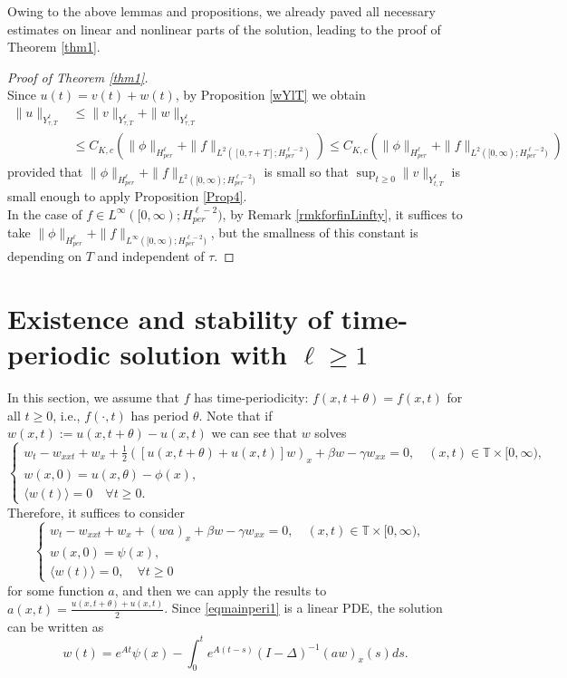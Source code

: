 \documentclass[10pt,a4paper,final]{article}
\numberwithin{equation}{section}
\newcommand{\lan}{\langle}
\newcommand{\ran}{\rangle}
\newcommand{\bT}{\mathbb{T}}
\newcommand{\Gb}{\beta}
\newcommand{\Gg}{\gamma}
\newcommand{\Gth}{\theta}
\begin{document}
Owing to the above lemmas and propositions, we already paved all necessary estimates on linear and nonlinear parts of the solution, leading to the proof of Theorem \ref{thm1}. 

\begin{proof}[Proof of Theorem \ref{thm1}]\ \\
    Since $u(t)=v(t)+w(t)$, by Proposition \ref{wYlT} we obtain
    \begin{align*}
        \|u\|_{Y^{\ell}_{\tau,T}}&\leq \|v\|_{Y^{\ell}_{\tau,T}}+\|w\|_{Y^{\ell}_{\tau,T}} \\&\leq C_{K,c} (\|\phi\|_{H^{\ell}_{per}}+\|f\|_{L^2([0,\tau+T];H^{\ell-2}_{per})})\leq C_{K,c} (\|\phi\|_{H^{\ell}_{per}}+\|f\|_{L^2([0,\infty);H^{\ell-2}_{per})})
    \end{align*}
    provided that $ \|\phi\|_{H^{\ell}_{per}}+\|f\|_{L^2([0,\infty);H^{\ell-2}_{per})}$ is small so that $\sup_{t\geq 0}\|v\|_{Y^{\ell}_{t,T}}$ is small enough to apply Proposition \ref{Prop4}.  \\

    In the case of $f\in L^{\infty}([0,\infty);H^{\ell-2}_{per})$, by Remark \ref{rmkforfinLinfty}, it suffices to take $\|\phi\|_{H^{\ell}_{per}}+\|f\|_{L^\infty([0,\infty);H^{\ell-2}_{per})}$, but the smallness of this constant is depending on $T$ and independent of $\tau$.
\end{proof}

\section{Existence and stability of time-periodic solution with $\ell\ge 1$}\label{Sec4}

In this section, we assume that $f$ has time-periodicity: $f(x,t+\theta)=f(x,t)$ for all $t\geq 0$, i.e., $f(\cdot,t)$ has period $\theta$. Note that if $w(x,t):=u(x,t+\Gth) -u(x,t)$ we can see that $w$ solves 
\begin{equation}\label{eqmainperi}
\begin{cases}
    w_t-w_{xxt}+w_x+\frac{1}{2}([u(x,t+\Gth)+u(x,t)]w)_x+\Gb w-\Gg w_{xx}=0,  \quad (x, t)\in \bT\times [0, \infty),&\\
    w(x,0)=u(x,\theta)-\phi(x), &\\
    \lan w(t)\ran=0 \quad \forall t\geq 0.&
    \end{cases}
\end{equation}
Therefore, it suffices to consider
\begin{equation}\label{eqmainperi1}
\begin{cases}
    w_t-w_{xxt}+w_x+(wa)_x+\Gb w-\Gg w_{xx}=0,  \quad (x, t)\in \bT\times [0, \infty),&\\
    w(x,0)=\psi(x),&\\
    \lan w(t)\ran =0, \quad \forall t\geq 0&
    \end{cases}
\end{equation}
for some function $a$, and then we can apply the results to $a(x,t)=\frac{u(x,t+\Gth)+u(x,t)}{2}$. Since \eqref{eqmainperi1} is a linear PDE, the solution can be written as 
$$w(t)=e^{At}\psi(x)-\int_0^te^{A(t-s)}(I-\Delta)^{-1}(aw)_x(s)ds.$$
\end{document}
